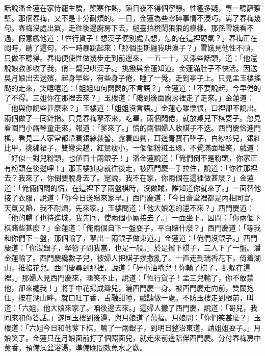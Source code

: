 話說潘金蓮在家恃寵生驕，顛寒作熱，鎭日夜不得個寧靜。性極多疑，專一聽籬察壁。那個春梅，又不是十分耐煩的。一日，金蓮為些零碎事情不湊巧，罵了春梅幾句。春梅沒處出氣，走徃後邊廚房下去，槌臺拍櫈鬧狠狠的模樣。那孫雪娥看不過，假意戲他道：「恠行貨子！想漢子便別處去想，怎的在這裡硬氣？」{}春梅正在悶時，聽了這句，不一時暴跳起來：「那個歪斯纏我哄漢子？」雪娥見他性不順，只做不聽得。春梅便使性做幾步走到前邊來，一五一十，又添些話頭，道：「他還說娘教爹收了我，俏一幫兒哄漢子。」挑撥與金蓮知道。金蓮滿肚子不快活。因送吳月娘出去送殯，起身早些，有些身子倦，睡了一覺，走到亭子上。只見孟玉樓搖颭的走來，{}笑嘻嘻道：「姐姐如何悶悶的不言語？」金蓮道：「不要說起，今早倦的了不得。三姐你在那裡去來？」玉樓道：「纔到後面廚房裡走了走來。」金蓮道：「他與你說些甚麼來？」玉樓道：「姐姐沒言語。」金蓮心雖懷恨，口裡卻不說出。兩個做了一囘針指。只見春梅拏茶來，吃畢，兩個悶倦，就放桌兒下棋耍子。忽見看園門小厮琴童走來，{}報道：「爹來了。」慌的兩個婦人收棋子不迭。西門慶恰進門檻，看見二人家常都帶着銀絲鬏髻，露着四鬢，耳邊青寶石墜子，白紗衫兒，銀紅比甲，挑線裙子，雙彎尖趫，紅鴛瘦小，一個個粉粧玉琢，不覺滿面堆笑，戲道：「好似一對兒粉頭，也値百十兩銀子！」潘金蓮說道：「俺們倒不是粉頭，你家正有粉頭在後邊哩！」{}那玉樓抽身就徃後走，被西門慶一手拉住，說道：「你徃那裡去？我來了，你倒要脫身去了。寔說，我不在家，你兩個在這裡做甚麼？」金蓮道：「俺倆個悶的慌，在這裡下了兩盤棋時，沒做賊，誰知道你就來了。」一面替他接了衣服，說道：「你今日送殯來家早。」西門慶道：「今日齋堂裡都是內相同官，天氣又熱，我不耐煩，先來家。」玉樓問道：「他大娘怎的還不來？」西門慶道：「他的轎子也待進城，我先囘，使兩個小厮接去了。」一面坐下。因問：「你兩個下棋賭些甚麼？」金蓮道：「俺兩個自下一盤耍子，平白賭什麼？」西門慶道：「等我和你們下一盤，那個輸了，拏出一兩銀子做東道。」金蓮道：「俺們沒銀子。」西門慶道：「你沒銀子，拏簪子問我當，也是一般。」於是擺下棋子，三人下了一盤。潘金蓮輸了。{}西門慶纔數子兒，被婦人把棋子撲撒亂了。一直走到瑞香花下，倚着湖山，推掐花兒。西門慶尋到那裡，說道：「好小油嘴兒！你輸了棋子，卻躲在這裡。」那婦人見西門慶來，暱笑不止，說道：「恠行貨子！孟三兒輸了，你不敢禁他，卻來纏我！」將手中花撮成瓣兒，灑西門慶一身。{}被西門慶走向前，雙關抱住，按在湖山畔，就口吐丁香，舌融甜唾，戲謔做一處。不防玉樓走到根前，叫道：「六姐，他大娘來家了。咱後邊去來。」這婦人撇了西門慶，說道：「哥兒，我囘來和你答話。」{}遂同玉樓到後邊，與月娘道了萬福。月娘問：「你們笑甚麼？」玉樓道：「六姐今日和他爹下棋，輸了一兩銀子，到明日整治東道，請姐姐耍子。」月娘笑了。金蓮只在月娘面前打了個照面兒，就走來前邊陪伴西門慶。分付春梅房中薰香，預備澡盆浴湯，準備晚間效魚水之歡。

